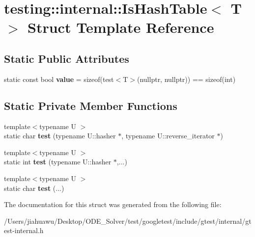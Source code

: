 \hypertarget{structtesting_1_1internal_1_1_is_hash_table}{}\section{testing\+:\+:internal\+:\+:Is\+Hash\+Table$<$ T $>$ Struct Template Reference}
\label{structtesting_1_1internal_1_1_is_hash_table}
\subsection*{Static Public Attributes}
\begin{DoxyCompactItemize}
\item 
\mbox{\label{structtesting_1_1internal_1_1_is_hash_table_a165e0a3eddfa5fadf9b950be6432d848}} 
static const bool {\bfseries value} = sizeof(test$<$T$>$(nullptr, nullptr)) == sizeof(int)
\end{DoxyCompactItemize}
\subsection*{Static Private Member Functions}
\begin{DoxyCompactItemize}
\item 
\mbox{\label{structtesting_1_1internal_1_1_is_hash_table_acc4d1e2307a1e0527932da7a7d354f06}} 
{\footnotesize template$<$typename U $>$ }\\static char {\bfseries test} (typename U\+::hasher $\ast$, typename U\+::reverse\+\_\+iterator $\ast$)
\item 
\mbox{\label{structtesting_1_1internal_1_1_is_hash_table_a195b49a6ae5090b6266a5fa4ab771962}} 
{\footnotesize template$<$typename U $>$ }\\static int {\bfseries test} (typename U\+::hasher $\ast$,...)
\item 
\mbox{\label{structtesting_1_1internal_1_1_is_hash_table_a40461295b959ff31e06241d4de072be0}} 
{\footnotesize template$<$typename U $>$ }\\static char {\bfseries test} (...)
\end{DoxyCompactItemize}


The documentation for this struct was generated from the following file\+:\begin{DoxyCompactItemize}
\item 
/\+Users/jiahuawu/\+Desktop/\+O\+D\+E\+\_\+\+Solver/test/googletest/include/gtest/internal/gtest-\/internal.\+h\end{DoxyCompactItemize}

